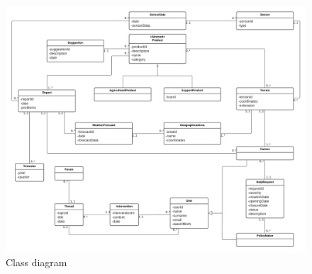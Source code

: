 \documentclass[10pt]{article}
\begin{document}
\begin{figure}[ht!]
    \centering
    \includegraphics[scale=0.45]{classDiagram.png}
    \caption{Class diagram}
    \label{fig:classDiagram}
\end{figure}
\newpage
\end{document}
